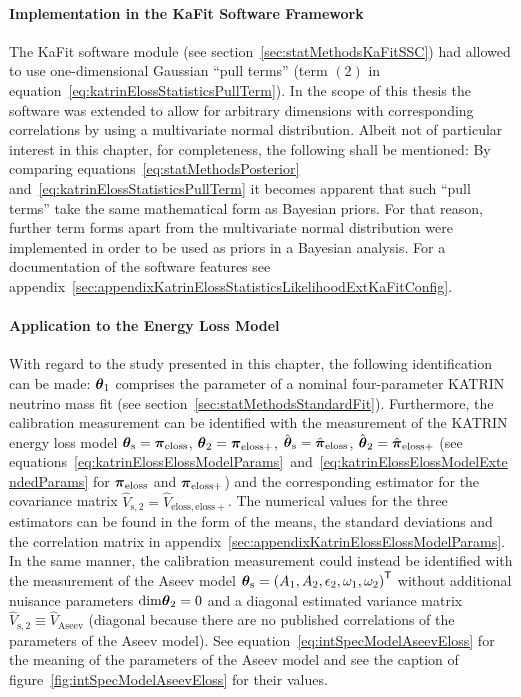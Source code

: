 \paragraph{Implementation in the KaFit Software Framework}
The KaFit software module (see section~\ref{sec:statMethodsKaFitSSC}) had allowed to use one-dimensional Gaussian ``pull terms'' (term $(2)$ in equation~\ref{eq:katrinElossStatisticsPullTerm}). In the scope of this thesis the software was extended to allow for arbitrary dimensions with corresponding correlations by using a multivariate normal distribution. Albeit not of particular interest in this chapter, for completeness, the following shall be mentioned: By comparing equations~\eqref{eq:statMethodsPosterior} and~\eqref{eq:katrinElossStatisticsPullTerm} it becomes apparent that such ``pull terms'' take the same mathematical form as Bayesian priors. For that reason, further term forms apart from the multivariate normal distribution were implemented in order to be used as priors in a Bayesian analysis. For a documentation of the software features see appendix~\ref{sec:appendixKatrinElossStatisticsLikelihoodExtKaFitConfig}.

\paragraph{Application to the Energy Loss Model}
With regard to the study presented in this chapter, the following identification can be made: $\boldsymbol{\mathbf{\theta}}_1$ comprises the parameter of a nominal four-parameter KATRIN neutrino mass fit (see section~\ref{sec:statMethodsStandardFit}). Furthermore, the calibration measurement can be identified with the measurement of the KATRIN energy loss model $\boldsymbol{\mathbf{\theta}}_\mathrm{s}=\boldsymbol{\mathbf{\pi}}_\mathrm{eloss}$, $\boldsymbol{\mathbf{\theta}}_2=\boldsymbol{\mathbf{\pi}}_\mathrm{eloss+}$, $\hat{\boldsymbol{\mathbf{\theta}}}_\mathrm{s}=\hat{\boldsymbol{\mathbf{\pi}}}_\mathrm{eloss}$, $\hat{\boldsymbol{\mathbf{\theta}}}_2=\hat{\boldsymbol{\mathbf{\pi}}}_\mathrm{eloss+}$ (see equations~\ref{eq:katrinElossElossModelParams}~and~\ref{eq:katrinElossElossModelExtendedParams} for $\boldsymbol{\mathbf{\pi}}_\mathrm{eloss}$ and $\boldsymbol{\mathbf{\pi}}_\mathrm{eloss+}$) and the corresponding estimator for the covariance matrix $\hat{V}_\mathrm{s,2}=\hat{V}_\mathrm{eloss,eloss+}$. The numerical values for the three estimators can be found in the form of the means, the standard deviations and the correlation matrix in appendix~\ref{sec:appendixKatrinElossElossModelParams}. In the same manner, the calibration measurement could instead be identified with the measurement of the Aseev model $\boldsymbol{\mathbf{\theta}}_\mathrm{s}={(A_1, A_2,\epsilon_2,\omega_1,\omega_2)}^{\mathsf{T}}$ without additional nuisance parameters $\mathrm{dim}\boldsymbol{\mathbf{\theta}}_2=0$ and a diagonal estimated variance matrix $\hat{V}_\mathrm{s,2}\equiv\hat{V}_\mathrm{Aseev}$ (diagonal because there are no published correlations of the parameters of the Aseev model). See equation~\eqref{eq:intSpecModelAseevEloss} for the meaning  of the parameters of the Aseev model and see the caption of figure~\ref{fig:intSpecModelAseevEloss} for their values.

